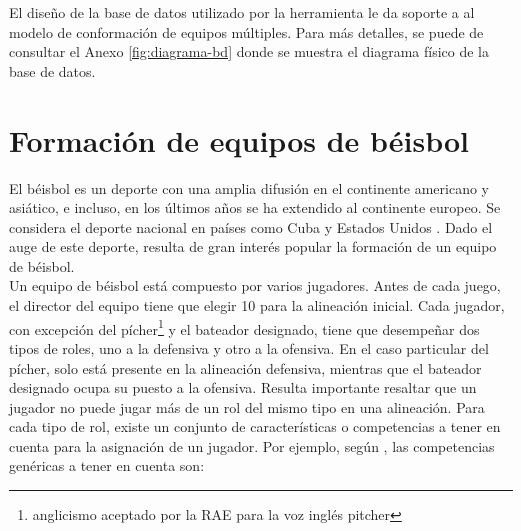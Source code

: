 El diseño de la base de datos utilizado por la herramienta le da soporte a al modelo de conformación de equipos múltiples. Para más detalles, se puede de consultar el Anexo \ref{fig:diagrama-bd} donde se muestra el diagrama físico de la base de datos.

\section{Formación de equipos de béisbol} \label{ej-pel}

El béisbol es un deporte con una amplia difusión en el continente americano y asiático, e incluso, en los últimos años se ha extendido al continente europeo. Se considera el deporte nacional en países como Cuba y Estados Unidos \cite{INEFI2020}. Dado el auge de este deporte, resulta de gran interés popular la formación de un equipo de béisbol.\\

Un equipo de béisbol está compuesto por varios jugadores. Antes de cada juego, el director del equipo tiene que elegir 10 para la alineación inicial. Cada jugador, con excepción del pícher\footnote{anglicismo aceptado por la RAE para la voz inglés pitcher} y el bateador designado, tiene que desempeñar dos tipos de roles, uno a la defensiva y otro a la ofensiva. En el caso particular del pícher, solo está presente en la alineación defensiva, mientras que el bateador designado ocupa su puesto a la ofensiva. Resulta importante resaltar que un jugador no puede jugar más de un rol del mismo tipo en una alineación. Para cada tipo de rol, existe un conjunto de características o competencias a tener en cuenta para la asignación de un jugador. Por ejemplo, según \cite{Smith1995},  las competencias genéricas a tener en cuenta son:

